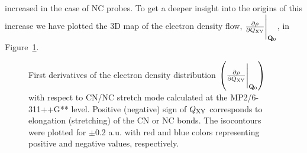 \documentclass[a4paper,titlepage,twoside,fleqn,12pt]{book}
\newcommand{\fderiv}[2]{\ensuremath{
\frac{\partial #1}{\partial #2}}}
\begin{document}
\begin{refsection}
increased in the case of NC probes. To get a deeper insight into the origins of this increase we 
have plotted the 3D map of the electron density flow, $\fderiv{\rho}{Q_{\rm XY}} \Bigg|_{{\bf Q}_{0}}$, 
in Figure~\ref{f:cnnc-maps}.
%
\begin{figure}[t!]
\centering
\setlength\fboxsep{0.4pt}
\setlength\fboxrule{0.5pt}
\caption{
First derivatives of the electron density distribution $\left( \fderiv{\rho}{Q_{\rm XY}} \Bigg|_{{\bf Q}_{0}} \right)$
with respect to CN/NC stretch mode calculated at the MP2/6-311++G** level. 
Positive (negative) sign of $Q_{\rm XY}$
corresponds to elongation (stretching) of the CN or NC bonds. The isocontours were 
plotted for $\pm$0.2 a.u. with red and blue colors representing positive and negative values, 
respectively.
\label{f:cnnc-maps}}
\end{figure}
%


\end{refsection}
\end{document}
